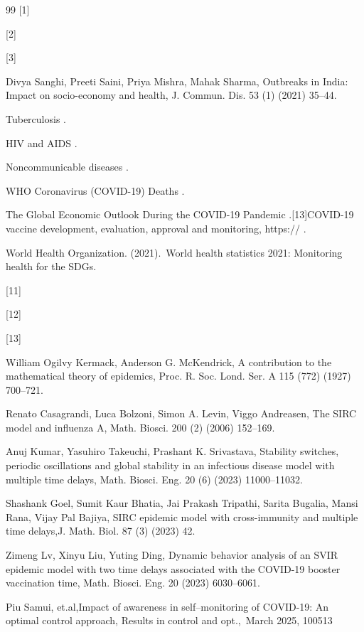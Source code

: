 \documentclass[10pt]{NSP1}
\begin{document}
\begin{thebibliography}{99}
[1]

[2]

[3]

Divya Sanghi, Preeti Saini, Priya Mishra, Mahak Sharma, Outbreaks in India: Impact on socio-economy and health, J. Commun. Dis. 53 (1) (2021) 35–44.

Tuberculosis .

HIV and AIDS .

Noncommunicable diseases .

WHO Coronavirus (COVID-19) Deaths .

The Global Economic Outlook During the COVID-19 Pandemic  .[13]COVID-19 vaccine development, evaluation, approval and monitoring, https:// .

World Health Organization. (2021). World health statistics 2021: Monitoring health for the SDGs. ​

[11]

[12]

[13]

William Ogilvy Kermack, Anderson G. McKendrick, A contribution to the mathematical theory of epidemics, Proc. R. Soc. Lond. Ser. A 115 (772) (1927) 700–721.

Renato Casagrandi, Luca Bolzoni, Simon A. Levin, Viggo Andreasen, The SIRC model and influenza A, Math. Biosci. 200 (2) (2006) 152–169.

Anuj Kumar, Yasuhiro Takeuchi, Prashant K. Srivastava, Stability switches, periodic oscillations and global stability in an infectious disease model with multiple time delays, Math. Biosci. Eng. 20 (6) (2023) 11000–11032.

Shashank Goel, Sumit Kaur Bhatia, Jai Prakash Tripathi, Sarita Bugalia, Mansi Rana, Vijay Pal Bajiya, SIRC epidemic model with cross-immunity and multiple time delays,J. Math. Biol. 87 (3) (2023) 42.

Zimeng Lv, Xinyu Liu, Yuting Ding, Dynamic behavior analysis of an SVIR epidemic model with two time delays associated with the COVID-19 booster vaccination time, Math. Biosci. Eng. 20 (2023) 6030–6061.

Piu Samui, et.al,Impact of awareness in self–monitoring of COVID-19: An optimal control approach, Results in control and opt., March 2025, 100513

\end{thebibliography}
\end{document}
